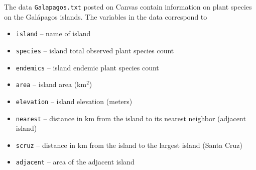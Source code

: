 \documentclass[11pt]{article}
\begin{document}
The data {\tt Galapagos.txt} posted on Canvas contain information on plant species on the Gal\'{a}pagos islands. The variables in the data correspond to
\begin{itemize}
\item {\tt island} -- name of island \\ \vspace{-8mm}
\item {\tt species} -- island total observed plant species count \\ \vspace{-8mm}
\item {\tt endemics} -- island endemic plant species count \\ \vspace{-8mm}
\item {\tt area} -- island area (km$^2$) \\ \vspace{-8mm}
\item {\tt elevation} -- island elevation (meters) \\ \vspace{-8mm}
\item {\tt nearest} -- distance in km from the island to its nearest neighbor (adjacent island) \\ \vspace{-8mm}
\item {\tt scruz} -- distance in km from the island to the largest island (Santa Cruz) \\ \vspace{-8mm}
\item {\tt adjacent} -- area of the adjacent island \\
\end{itemize}
\end{document}
